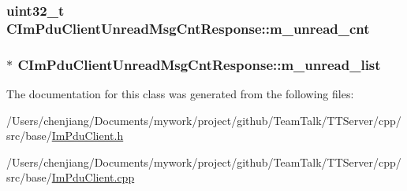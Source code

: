 \subsubsection[{m\+\_\+unread\+\_\+cnt}]{\setlength{\rightskip}{0pt plus 5cm}uint32\+\_\+t C\+Im\+Pdu\+Client\+Unread\+Msg\+Cnt\+Response\+::m\+\_\+unread\+\_\+cnt\hspace{0.3cm}{\ttfamily [private]}}\label{class_c_im_pdu_client_unread_msg_cnt_response_aa5e6a84678a40b7cb3e974ef638c3669}
\hypertarget{class_c_im_pdu_client_unread_msg_cnt_response_a1623e405e83ca410c9cc756740442339}{}
\subsubsection[{m\+\_\+unread\+\_\+list}]{$\ast$ C\+Im\+Pdu\+Client\+Unread\+Msg\+Cnt\+Response\+::m\+\_\+unread\+\_\+list\hspace{0.3cm}{\ttfamily [private]}}\label{class_c_im_pdu_client_unread_msg_cnt_response_a1623e405e83ca410c9cc756740442339}


The documentation for this class was generated from the following files\+:\begin{DoxyCompactItemize}
\item 
/\+Users/chenjiang/\+Documents/mywork/project/github/\+Team\+Talk/\+T\+T\+Server/cpp/src/base/\hyperlink{_im_pdu_client_8h}{Im\+Pdu\+Client.\+h}\item 
/\+Users/chenjiang/\+Documents/mywork/project/github/\+Team\+Talk/\+T\+T\+Server/cpp/src/base/\hyperlink{_im_pdu_client_8cpp}{Im\+Pdu\+Client.\+cpp}\end{DoxyCompactItemize}
